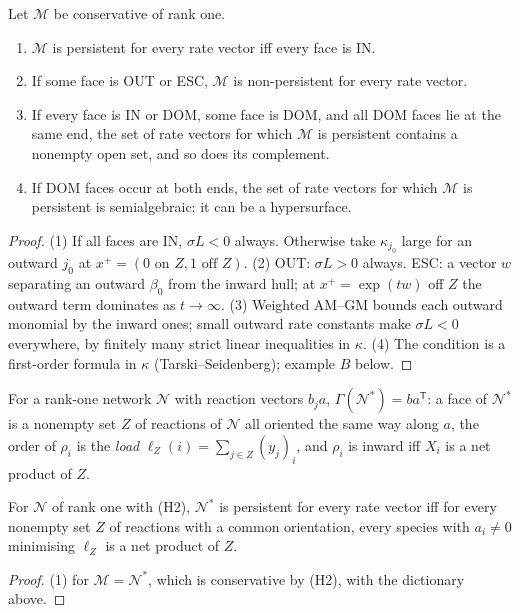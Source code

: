\documentclass[11pt,a4paper]{report}
\newcommand{\Net}{\mathcal{N}}
\newcommand{\Nd}{\mathcal{N}^{*}}
\newcommand{\tp}{^{\mathsf T}}
\begin{document}
\begin{theorem}\label{thm:S1}
Let \(\mathcal M\) be conservative of rank one.
\begin{enumerate}
\item \(\mathcal M\) is persistent for every rate vector iff every face is IN.
\item If some face is OUT or ESC, \(\mathcal M\) is non-persistent for every rate vector.
\item If every face is IN or DOM, some face is DOM, and all DOM faces lie at the same end, the set of rate vectors for
which \(\mathcal M\) is persistent contains a nonempty open set, and so does its complement.
\item If DOM faces occur at both ends, the set of rate vectors for which \(\mathcal M\) is persistent is semialgebraic; it
can be a hypersurface.
\end{enumerate}
\end{theorem}
\begin{proof}
(1) If all faces are IN, \(\sigma L<0\) always. Otherwise take \(\kappa_{j_0}\) large for an outward \(j_0\) at
\(x^+=(0\text{ on }Z,1\text{ off }Z)\). (2) OUT: \(\sigma L>0\) always. ESC: a vector \(w\) separating an outward \(\beta_0\)
from the inward hull; at \(x^+=\exp(tw)\) off \(Z\) the outward term dominates as \(t\to\infty\). (3) Weighted AM--GM
bounds each outward monomial by the inward ones; small outward rate constants make \(\sigma L<0\) everywhere, by
finitely many strict linear inequalities in \(\kappa\). (4) The condition is a first-order formula in \(\kappa\)
(Tarski--Seidenberg); example \(B\) below.
\end{proof}

For a rank-one network \(\Net\) with reaction vectors \(b_ja\), \(\Gamma(\Nd)=ba\tp\): a face of \(\Nd\) is a nonempty set
\(Z\) of reactions of \(\Net\) all oriented the same way along \(a\), the order of \(\rho_i\) is the \emph{load}
\(\ell_Z(i)=\sum_{j\in Z}(y_j)_i\), and \(\rho_i\) is inward iff \(X_i\) is a net product of \(Z\).

\begin{corollary}[the test on \(\Net\); agent Q1]\label{cor:S1N}
For \(\Net\) of rank one with (H2), \(\Nd\) is persistent for every rate vector iff for every nonempty set \(Z\) of reactions
with a common orientation, every species with \(a_i\ne0\) minimising \(\ell_Z\) is a net product of \(Z\).
\end{corollary}
\begin{proof}
(1) for \(\mathcal M=\Nd\), which is conservative by (H2), with the dictionary above.
\end{proof}
\end{document}
